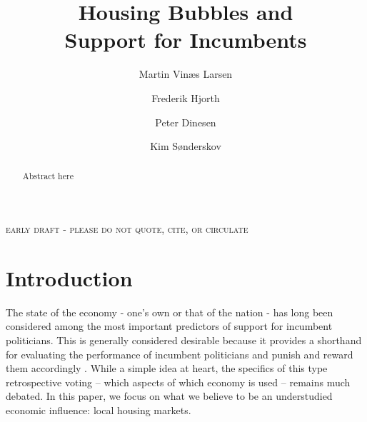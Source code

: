 \documentclass[12pt,a4paper]{article}
\title{\textbf{Housing Bubbles and \\Support for Incumbents}}
\author{
Martin Vinæs Larsen \and Frederik Hjorth \and Peter  Dinesen \and Kim  Sønderskov    }
\begin{document}
\maketitle

\begin{center}
\textsc{early draft - please do not quote, cite, or circulate}
\end{center}

\begin{abstract} Abstract here
\noindent %
 
\end{abstract}



\newpage

\doublespacing

\section{Introduction}
The state of the economy - one’s own or that of the nation - has long been considered among the most important predictors of support for incumbent politicians. This is generally considered desirable because it provides a shorthand for evaluating the performance of incumbent politicians and punish and reward them accordingly \citep{ashworth2012electoral,healy2013retrospective}. While a simple idea at heart, the specifics of this type retrospective voting -- which aspects of which economy is used -- remains much debated. In this paper, we focus on what we believe to be an understudied economic influence: local housing markets. 
\end{document}
